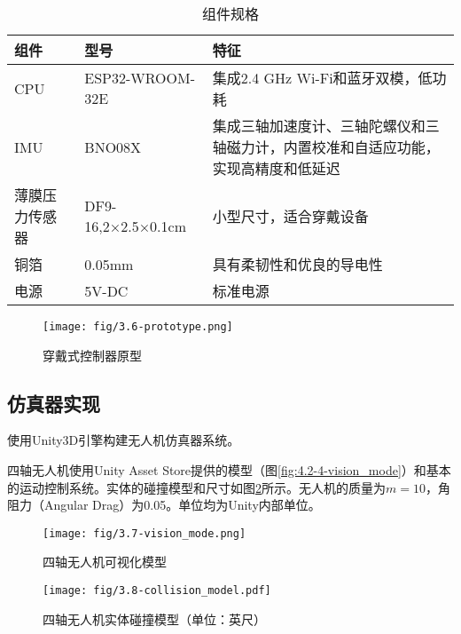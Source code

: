 \begin{table}
    \centering
    \caption{\label{tab:hardware}组件规格}
    \begin{tabular}{>{\raggedright\arraybackslash}p{2.5cm} p{4cm} p{4cm}}
        \toprule
        \textbf{组件} & \textbf{型号}        & \textbf{特征}                                                  \\
        \midrule
        CPU         & ESP32-WROOM-32E    & 集成2.4 GHz Wi-Fi和蓝牙双模，低功耗                                   \\ \midrule
        IMU       & BNO08X             & 集成三轴加速度计、三轴陀螺仪和三轴磁力计，内置校准和自适应功能，实现高精度和低延迟                 \\ \midrule
        薄膜压力传感器     & DF9-16,2×2.5×0.1cm & 小型尺寸，适合穿戴设备                                                \\ \midrule
        铜箔          & 0.05mm             & 具有柔韧性和优良的导电性                                               \\ \midrule
        电源          & 5V-DC              & 标准电源                                                         \\
        \bottomrule
    \end{tabular}
\end{table}

\begin{figure}[htbp]
    \centering
    \texttt{[image:  fig/3.6-prototype.png]}
    \caption{穿戴式控制器原型}
    \label{fig:4.2-2-prototype}
\end{figure}

\clearpage

\subsection{仿真器实现}

使用Unity3D引擎构建无人机仿真器系统。

四轴无人机使用Unity Asset Store提供的模型（图\ref{fig:4.2-4-vision_mode}）和基本的运动控制系统。实体的碰撞模型和尺寸如图\ref{fig:4.2-3-collision_model}所示。无人机的质量为$m=10$，角阻力（Angular Drag）为0.05。单位均为Unity内部单位。

\begin{figure}[htbp]
    \centering
    \texttt{[image:  fig/3.7-vision\_mode.png]}
    \caption{四轴无人机可视化模型}
    \label{fig:4.2-4-vision_mode}

    \texttt{[image:  fig/3.8-collision\_model.pdf]}
    \caption{四轴无人机实体碰撞模型（单位：英尺）}
    \label{fig:4.2-3-collision_model}
\end{figure}

